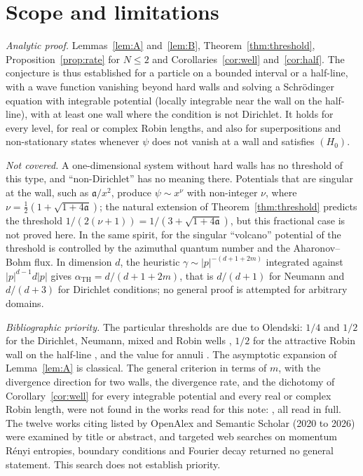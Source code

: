 \documentclass[11pt,a4paper]{article}
\theoremstyle{definition}
\theoremstyle{plain}
\newcommand{\aTH}{\alpha_{\mathrm{TH}}}
\begin{document}
\section{Scope and limitations}\label{sec:scope}
\emph{Analytic proof.} Lemmas~\ref{lem:A} and~\ref{lem:B},
Theorem~\ref{thm:threshold}, Proposition~\ref{prop:rate} for $N\le2$ and
Corollaries~\ref{cor:well} and~\ref{cor:half}. The conjecture is thus
established for a particle on a bounded interval or a half-line, with a wave
function vanishing beyond hard walls and solving a Schr\"odinger equation with
integrable potential (locally integrable near the wall on the half-line), with
at least one wall where the condition is not Dirichlet. It holds for every
level, for real or complex Robin lengths, and also for superpositions and
non-stationary states whenever $\psi$ does not vanish at a wall and satisfies
$(H_0)$.

\emph{Not covered.} A one-dimensional system without hard walls has no
threshold of this type, and ``non-Dirichlet'' has no meaning there. Potentials
that are singular at the wall, such as $\mathfrak a/x^2$, produce
$\psi\sim x^\nu$ with non-integer $\nu$, where
$\nu=\frac12(1+\sqrt{1+4\mathfrak a})$; the natural extension of
Theorem~\ref{thm:threshold} predicts the threshold $1/(2(\nu+1))
=1/(3+\sqrt{1+4\mathfrak a})$, but this fractional case is not proved here.
In the same spirit, for the singular ``volcano'' potential of
\cite{Olendski2022} the threshold is controlled by the azimuthal quantum number
and the Aharonov--Bohm flux. In
dimension $d$, the heuristic $\gamma\sim|p|^{-(d+1+2m)}$ integrated against
$|p|^{d-1}d|p|$ gives $\aTH=d/(d+1+2m)$, that is $d/(d+1)$ for Neumann and
$d/(d+3)$ for Dirichlet conditions; no general proof is attempted for
arbitrary domains.

\emph{Bibliographic priority.} The particular thresholds are due to
Olendski: $1/4$ and $1/2$ for the Dirichlet, Neumann, mixed and Robin wells
\cite{Olendski2020}, $1/2$ for the attractive Robin wall on the half-line
\cite{Olendski2019}, and the value for annuli \cite{Olendski2022}. The asymptotic
expansion of Lemma~\ref{lem:A} is classical. The general criterion in terms of
$m$, with the divergence direction for two walls, the divergence rate, and the
dichotomy of Corollary~\ref{cor:well} for every integrable potential and every
real or complex Robin length, were not found in the works read for this note:
\cite{Olendski2020,Olendski2019,Olendski2022,ADST2012,BB2006}, all read in
full. The twelve works
citing \cite{Olendski2020} listed by OpenAlex and Semantic Scholar (2020 to
2026) were examined by title or abstract, and targeted web searches on momentum
R\'enyi entropies, boundary conditions and Fourier decay returned no general
statement. This search does not establish priority.
\end{document}
